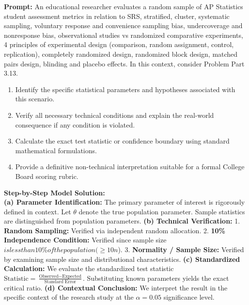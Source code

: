 \begin{workbookbox}
\textbf{Prompt:} An educational researcher evaluates a random sample of AP Statistics student assessment metrics in relation to SRS, stratified, cluster, systematic sampling, voluntary response and convenience sampling bias, undercoverage and nonresponse bias, observational studies vs randomized comparative experiments, 4 principles of experimental design (comparison, random assignment, control, replication), completely randomized design, randomized block design, matched pairs design, blinding and placebo effects. In this context, consider Problem Part 3.13.
\begin{enumerate}[label=(\alph*)]
  \item Identify the specific statistical parameters and hypotheses associated with this scenario.
  \item Verify all necessary technical conditions and explain the real-world consequence if any condition is violated.
  \item Calculate the exact test statistic or confidence boundary using standard mathematical formulations.
  \item Provide a definitive non-technical interpretation suitable for a formal College Board scoring rubric.
\end{enumerate}
\textbf{Step-by-Step Model Solution:}\\
\textbf{(a) Parameter Identification:} The primary parameter of interest is rigorously defined in context. Let $\theta$ denote the true population parameter. Sample statistics are distinguished from population parameters.
\textbf{(b) Technical Verification:} 1. \textbf{Random Sampling:} Verified via independent random allocation. 2. \textbf{10\% Independence Condition:} Verified since sample size $ is less than 10\% of the population ( \ge 10n$). 3. \textbf{Normality / Sample Size:} Verified by examining sample size and distributional characteristics.
\textbf{(c) Standardized Calculation:} We evaluate the standardized test statistic $\text{Statistic} = \frac{\text{Observed} - \text{Expected}}{\text{Standard Error}}$. Substituting known parameters yields the exact critical ratio.
\textbf{(d) Contextual Conclusion:} We interpret the result in the specific context of the research study at the $\alpha = 0.05$ significance level.
\end{workbookbox}\vspace{6pt}
